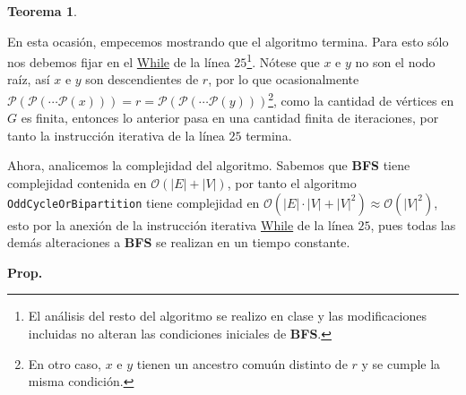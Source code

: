\documentclass{article}
\newcommand{\code}[1]{\textcolor{white!25!black}{\texttt{#1}}}
\newtheorem*{theorem}{Teorema}
\begin{document}
\begin{enumerate}
\begin{center}
{\begin{minipage}[b][1\height]
\begin{theorem}
        \end{theorem}
    \end{minipage}}
  \end{center}
  En esta ocasi\'on, empecemos mostrando que el algoritmo termina. Para esto s\'olo nos
  debemos fijar en el \underline{While} de  la l\'inea $25$\footnote{El an\'alisis del
    resto del algoritmo se realizo en clase y las modificaciones incluidas no alteran las
    condiciones iniciales de \textbf{BFS}.}. N\'otese que $x$ e $y$ no son el nodo  ra\'iz,
  as\'i $x$ e $y$ son descendientes de $r$, por lo que ocasionalmente
  $\mathcal{P}(\mathcal{P}(\dotsm\mathcal{P}(x))) = r = \mathcal{P}(\mathcal{P}(\dotsm\mathcal{P}(y)))$\footnote{En
  otro caso, $x$ e $y$ tienen un ancestro comu\'un distinto de $r$ y se cumple la misma condici\'on.},
  como la cantidad de v\'ertices en $G$ es finita, entonces lo anterior pasa en una cantidad
  finita de iteraciones, por tanto la instrucci\'on iterativa de la l\'inea $25$ termina.
  
  Ahora, analicemos la complejidad del algoritmo. Sabemos que \textbf{BFS} tiene complejidad contenida
  en $\mathcal{O}(|E| + |V|)$, por tanto el algoritmo \code{OddCycleOrBipartition} tiene complejidad
  en $\mathcal{O}(|E|\cdot|V| + |V|^2) \approx \mathcal{O}(|V|^2)$, esto por la anexi\'on de la instrucci\'on
  iterativa \underline{While} de la l\'inea $25$, pues todas las dem\'as alteraciones a \textbf{BFS} se realizan
  en un tiempo constante.
  
  \textbf{Prop.}
\end{enumerate}
\end{document}
